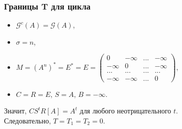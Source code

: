 \documentclass{beamer}
\begin{document}

\begin{frame}
\frametitle{Границы T для цикла}
\begin{itemize}
\item $\mathcal{G}^c(A) = \mathcal{G}(A)$,
\item $\sigma = n$,
\item
$M = (A^n)^* = E^* = E = \begin{pmatrix}
0 & -\infty & ... & -\infty \\
-\infty & 0 & ... & -\infty \\
... & ... & ... & ... \\
-\infty & -\infty & ... & 0
\end{pmatrix}$,
\item $C = R = E$, $S = A$, $B = -\infty$.
\end{itemize}
Значит, $CS^tR[A] = A^t$ для любого неотрицательного $t$.\\
Следовательно, $T = T_1 = T_2 = 0$.
\end{frame}

\end{document}
